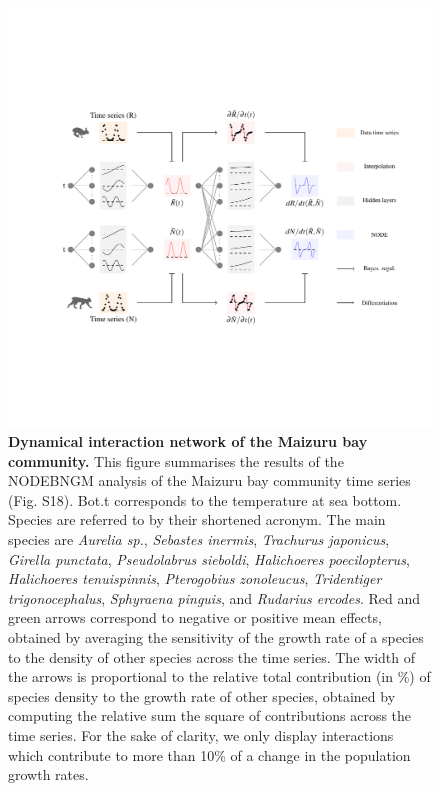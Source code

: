 \documentclass[11pt, oneside]{article}
\begin{document}
\newpage
\begin{figure}[H]
\begin{center}
\includegraphics[width=\linewidth,page=8]{figures/main.pdf}
\caption{
    \textbf{Dynamical interaction network of the Maizuru bay community.}
    This figure summarises the results of the NODEBNGM analysis of the Maizuru bay community time series (Fig. S18). 
    Bot.t corresponds to the temperature at sea bottom. Species are referred to by their shortened acronym.
    The main species are \textit{Aurelia sp.}, \textit{Sebastes inermis}, \textit{Trachurus japonicus}, \textit{Girella punctata}, \textit{Pseudolabrus sieboldi}, \textit{Halichoeres poecilopterus}, \textit{Halichoeres tenuispinnis}, \textit{Pterogobius zonoleucus}, \textit{Tridentiger trigonocephalus}, \textit{Sphyraena pinguis}, and \textit{Rudarius ercodes}.
    Red and green arrows correspond to negative or positive mean effects, obtained by averaging the sensitivity of the growth rate of a species to the density of other species across the time series. 
    The width of the arrows is proportional to the relative total contribution (in \%) of species density to the growth rate of other species, obtained by computing the relative sum the square of contributions across the time series.
    For the sake of clarity, we only display interactions which contribute to more than 10\% of a change in the population growth rates.
}
\end{center}
\end{figure}
\newpage
\end{document}
